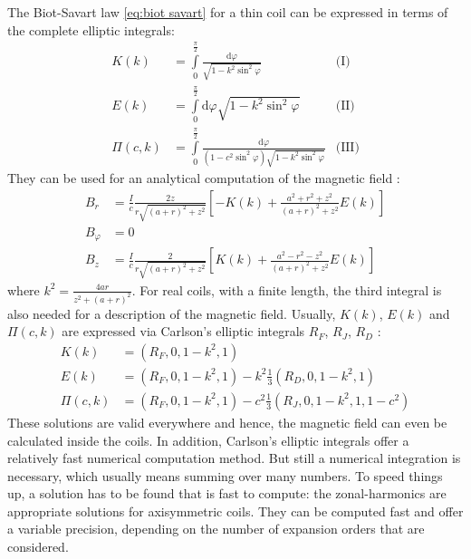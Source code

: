 	  The Biot-Savart law \eqref{eq:biot savart} for a thin coil can be expressed in terms of the complete elliptic integrals:
	\begin{equation}
		\begin{aligned}
			K(k) &= \int\limits_{0}^{\frac{\pi}{2}} \frac{\mathrm d\varphi}{\sqrt{1-k^{2}\sin^{2}\varphi}} & \text{(I)}\\
			E(k) &= \int\limits_{0}^{\frac{\pi}{2}} \mathrm{d}\varphi\sqrt{1-k^{2}\sin^{2}\varphi} & \text{(II)} \\
			\Pi(c,k) &= \int\limits_{0}^{\frac{\pi}{2}} \frac{\mathrm d\varphi}{(1-c^{2}\sin^{2}\varphi)\sqrt{1-k^{2}\sin^{2}\varphi}}  & \text{(III)}
		\end{aligned}
		\label{eq:complete elliptic integrals}
	\end{equation}
	They can be used for an analytical computation of the magnetic field \cite{jackson}:
	\begin{equation}
		\begin{aligned}
			B_{r} &= \frac{I}{c} \frac{2z}{r\sqrt{(a+r)^{2}+z^{2}}} \left[ -K(k) + \frac{a^{2}+r^{2}+z^{2}}{(a+r)^{2}+z^{2}}E(k)\right] \\
			B_{\varphi} &= 0 \\
			B_{z} &= \frac{I}{c} \frac{2}{r\sqrt{(a+r)^{2}+z^{2}}} \left[ K(k) + \frac{a^{2}-r^{2}-z^{2}}{(a+r)^{2}+z^{2}}E(k)\right]
		\end{aligned}
		\label{eq:magnetic field elliptic integrals}
	\end{equation}
	where $k^2 = \frac{4ar}{z^2 + \left(a+r\right)^2}$. For real coils, with a finite length, the third integral is also needed for a description of the magnetic field. Usually, $K(k)$, $E(k)$ and $\Pi(c,k)$ are expressed via Carlson's elliptic integrals $R_F$, $R_J$, $R_D$ \cite{numericalrecipes}: 
	\begin{equation}
		\begin{aligned}
			K(k) &= (R_{F},0, 1-k^{2},1)\\
			E(k) &= (R_{F},0, 1-k^{2},1) - k^{2}\frac{1}{3}(R_{D},0, 1-k^{2},1) \\
			\Pi(c,k) &= (R_{F},0, 1-k^{2},1) - c^{2}\frac{1}{3}(R_{J},0, 1-k^{2},1,1-c^{2})
		\end{aligned}
		\label{eq:complete elliptic integrals through carlson}
	\end{equation}
	These solutions are valid everywhere and hence, the magnetic field can even be calculated inside the coils. In addition, Carlson's elliptic integrals offer a relatively fast numerical computation method. But still a numerical integration is necessary, which usually means summing over many numbers. To speed things up, a solution has to be found that is fast to compute: the zonal-harmonics are appropriate solutions for axisymmetric coils. They can be computed fast and offer a variable precision, depending on the number of expansion orders that are considered.

